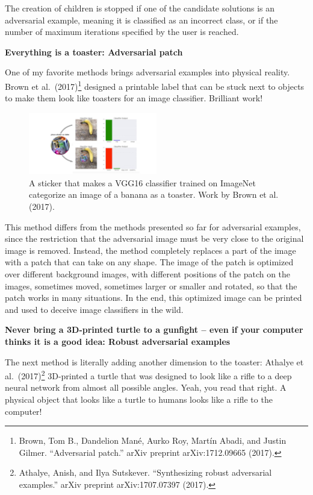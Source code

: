 \documentclass[
  11pt,
]{scrbook}
\begin{document}
The creation of children is stopped if one of the candidate solutions is an adversarial example, meaning it is classified as an incorrect class, or if the number of maximum iterations specified by the user is reached.

\textbf{Everything is a toaster: Adversarial patch}

One of my favorite methods brings adversarial examples into physical reality.
Brown et al.~(2017)\footnote{Brown, Tom B., Dandelion Mané, Aurko Roy, Martín Abadi, and Justin Gilmer. ``Adversarial patch.'' arXiv preprint arXiv:1712.09665 (2017).} designed a printable label that can be stuck next to objects to make them look like toasters for an image classifier.
Brilliant work!

\begin{figure}

{\centering \includegraphics[width=0.5\textwidth]{images/adversarial-toaster} 

}

\caption{A sticker that makes a VGG16 classifier trained on ImageNet categorize an image of a banana as a toaster. Work by Brown et al. (2017).}\label{fig:adversarial-toaster}
\end{figure}

This method differs from the methods presented so far for adversarial examples, since the restriction that the adversarial image must be very close to the original image is removed.
Instead, the method completely replaces a part of the image with a patch that can take on any shape.
The image of the patch is optimized over different background images, with different positions of the patch on the images, sometimes moved, sometimes larger or smaller and rotated, so that the patch works in many situations.
In the end, this optimized image can be printed and used to deceive image classifiers in the wild.

\textbf{Never bring a 3D-printed turtle to a gunfight -- even if your computer thinks it is a good idea: Robust adversarial examples}

The next method is literally adding another dimension to the toaster:
Athalye et al.~(2017)\footnote{Athalye, Anish, and Ilya Sutskever. ``Synthesizing robust adversarial examples.'' arXiv preprint arXiv:1707.07397 (2017).} 3D-printed a turtle that was designed to look like a rifle to a deep neural network from almost all possible angles.
Yeah, you read that right.
A physical object that looks like a turtle to humans looks like a rifle to the computer!
\end{document}
